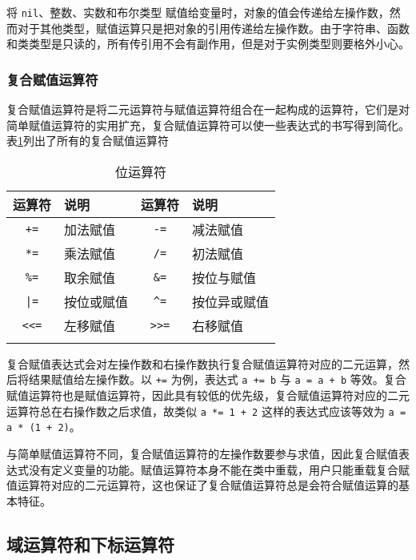 将 \texttt{nil}、整数、实数和布尔类型 赋值给变量时，对象的值会传递给左操作数，然而对于其他类型，赋值运算只是把对象的引用传递给左操作数。由于字符串、函数和类类型是只读的，所有传引用不会有副作用，但是对于实例类型则要格外小心。

\subsubsection{复合赋值运算符}

复合赋值运算符是将二元运算符与赋值运算符组合在一起构成的运算符，它们是对简单赋值运算符的实用扩充，复合赋值运算符可以使一些表达式的书写得到简化。表\ref{tab::compound_assign}列出了所有的复合赋值运算符

\begin{table}[htb]
    \centering
    \setlength{\tabcolsep}{10mm}
    \begin{tabular}{clcl} \Xhline{1pt}
        \textbf{运算符} & \textbf{说明} & \textbf{运算符} & \textbf{说明} \\ \hline
        \texttt{+=} & 加法赋值 & \texttt{-=} & 减法赋值 \\
        \texttt{*=} & 乘法赋值 & \texttt{/=} & 初法赋值 \\
        \texttt{\%=} & 取余赋值 & \texttt{\&=} & 按位与赋值 \\
        \texttt{|=} & 按位或赋值 & \texttt{\textasciicircum=} & 按位异或赋值 \\
        \texttt{<<=} & 左移赋值 & \texttt{>>=} & 右移赋值 \\
        \Xhline{1pt}
    \end{tabular}
    \caption{位运算符}
    \label{tab::compound_assign}
\end{table}

复合赋值表达式会对左操作数和右操作数执行复合赋值运算符对应的二元运算，然后将结果赋值给左操作数。以 \texttt{+=} 为例，表达式 \texttt{a += b} 与 \texttt{a = a + b} 等效。复合赋值运算符也是赋值运算符，因此具有较低的优先级，复合赋值运算符对应的二元运算符总在右操作数之后求值，故类似 \texttt{a *= 1 + 2} 这样的表达式应该等效为 \texttt{a = a * (1 + 2)}。

与简单赋值运算符不同，复合赋值运算符的左操作数要参与求值，因此复合赋值表达式没有定义变量的功能。赋值运算符本身不能在类中重载，用户只能重载复合赋值运算符对应的二元运算符，这也保证了复合赋值运算符总是会符合赋值运算的基本特征。

\subsection{域运算符和下标运算符}

